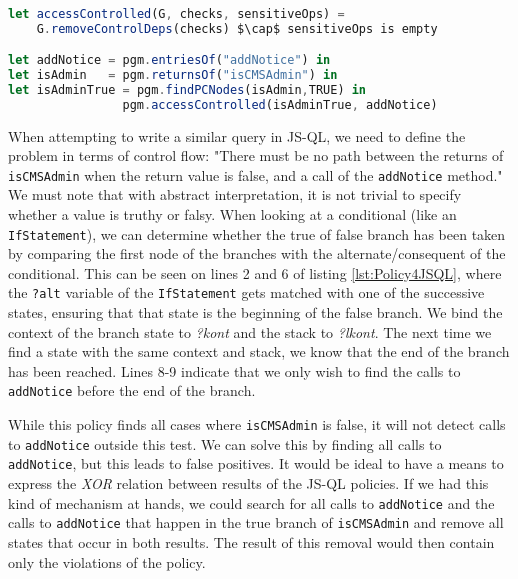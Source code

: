 \begin{lstlisting}[label={lst:Policy4PidginQL},language=JavaScript,caption=Policy 4 in PidginQL,mathescape=true]  % float=t?

let accessControlled(G, checks, sensitiveOps) = 
    G.removeControlDeps(checks) $\cap$ sensitiveOps is empty

let addNotice = pgm.entriesOf("addNotice") in
let isAdmin   = pgm.returnsOf("isCMSAdmin") in 
let isAdminTrue = pgm.findPCNodes(isAdmin,TRUE) in
                pgm.accessControlled(isAdminTrue, addNotice)
\end{lstlisting}

When attempting to write a similar query in JS-QL, we need to define the problem in terms of control flow: "There must be no path between the returns of \texttt{isCMSAdmin} when the return value is false, and a call of the \texttt{addNotice} method." We must note that with abstract interpretation, it is not trivial to specify whether a value is truthy or falsy. When looking at a conditional (like an \texttt{IfStatement}), we can determine whether the true of false branch has been taken by comparing the first node of the branches with the alternate/consequent of the conditional. This can be seen on lines 2 and 6 of listing \ref{lst:Policy4JSQL}, where the \texttt{?alt} variable of the \texttt{IfStatement} gets matched with one of the successive states, ensuring that that state is the beginning of the false branch. We bind the context of the branch state to \textit{?kont} and the stack to \textit{?lkont}. The next time we find a state with the same context and stack, we know that the end of the branch has been reached. Lines 8-9 indicate that we only wish to find the calls to \texttt{addNotice} before the end of the branch.

While this policy finds all cases where \texttt{isCMSAdmin} is false, it will not detect calls to \texttt{addNotice} outside this test. We can solve this by finding all calls to \texttt{addNotice}, but this leads to false positives. It would be ideal to have a means to express the \textit{XOR} relation between results of the JS-QL policies. If we had this kind of mechanism at hands, we could search for all calls to \texttt{addNotice} and the calls to \texttt{addNotice} that happen in the true branch of \texttt{isCMSAdmin} and remove all states that occur in both results. The result of this removal would then contain only the violations of the policy.

